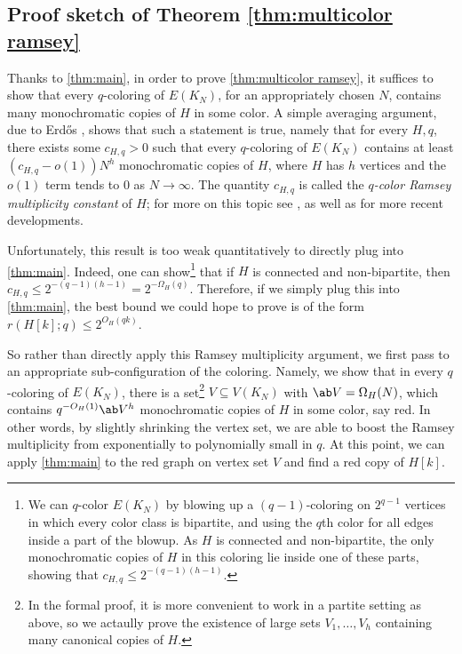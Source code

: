 \subsection{Proof sketch of Theorem \ref{thm:multicolor ramsey}}
Thanks to \cref{thm:main}, in order to prove \cref{thm:multicolor ramsey}, it suffices to show that every $q$-coloring of $E(K_N)$, for an appropriately chosen $N$, contains many monochromatic copies of $H$ in some color. 
A simple averaging argument, due to Erd\H os \cite{MR0151956}, shows that such a statement is true, namely that for every $H,q$, there exists some $c_{H,q}>0$ such that every $q$-coloring of $E(K_N)$ contains at least $(c_{H,q}-o(1))N^h$ monochromatic copies of $H$, where $H$ has $h$ vertices and the $o(1)$ term tends to $0$ as $N \to \infty$. The quantity $c_{H,q}$ is called the \emph{$q$-color Ramsey multiplicity constant} of $H$; for more on this topic see \cite[Section 2.6]{MR3497267}, as well as \cite{2206.05800,MR4618272,MR4426765} for more recent developments. 

Unfortunately, this result is too weak quantitatively to directly plug into \cref{thm:main}. Indeed, one can show\footnote{We can $q$-color $E(K_N)$ by blowing up a $(q-1)$-coloring on $2^{q-1}$ vertices in which every color class is bipartite, and using the $q$th color for all edges inside a part of the blowup. As $H$ is connected and non-bipartite, the only monochromatic copies of $H$ in this coloring lie inside one of these parts, showing that $c_{H,q} \leq 2^{-(q-1)(h-1)}$.} that 
if $H$ is connected and non-bipartite, then $c_{H,q} \leq 2^{-(q-1)(h-1)} =2^{-\Omega_H(q)}$. Therefore, if we simply plug this into \cref{thm:main}, the best bound we could hope to prove is of the form $r(H[k];q) \leq 2^{O_H(qk)}$.

So rather than directly apply this Ramsey multiplicity argument, we first pass to an appropriate sub-configuration of the coloring. Namely, we show that in every $q$-coloring of $E(K_N)$, there is a set\footnote{In the formal proof, it is more convenient to work in a partite setting as above, so we actaully prove the existence of large sets $V_1,\dots,V_h$ containing many canonical copies of $H$.} $V \subseteq V(K_N)$ with $\ab V = \Omega_H(N)$, which contains $q^{-O_H(1)} \ab V^h$ monochromatic copies of $H$ in some color, say red. In other words, by slightly shrinking the vertex set, we are able to boost the Ramsey multiplicity from exponentially to polynomially small in $q$. At this point, we can apply \cref{thm:main} to the red graph on vertex set $V$ and find a red copy of $H[k]$.

